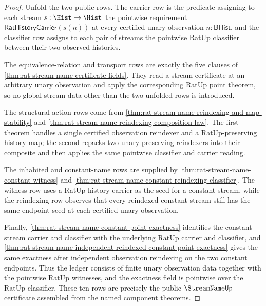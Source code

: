 \begin{proof}
Unfold the two public rows. The carrier row is the predicate assigning to each
stream $s:\Hist\to\Hist$ the pointwise requirement
$\mathsf{RatHistoryCarrier}(s(n))$ at every certified unary observation
$n:\mathsf{BHist}$, and the classifier row assigns to each pair of streams the
pointwise RatUp classifier between their two observed histories.

The equivalence-relation and transport rows are exactly the five clauses of
\autoref{thm:rat-stream-name-certificate-fields}. They read a stream
certificate at an arbitrary unary observation and apply the corresponding
RatUp point theorem, so no global stream data other than the two unfolded rows
is introduced.

The structural action rows come from
\autoref{thm:rat-stream-name-reindexing-and-map-stability} and
\autoref{thm:rat-stream-name-reindexing-composition-law}. The first theorem
handles a single certified observation reindexer and a RatUp-preserving history
map; the second repacks two unary-preserving reindexers into their composite and
then applies the same pointwise classifier and carrier reading.

The inhabited and constant-name rows are supplied by
\autoref{thm:rat-stream-name-constant-witness} and
\autoref{thm:rat-stream-name-constant-reindexing-classifier}. The witness row
uses a RatUp history carrier as the seed for a constant stream, while the
reindexing row observes that every reindexed constant stream still has the same
endpoint seed at each certified unary observation.

Finally,
\autoref{thm:rat-stream-name-constant-point-exactness} identifies the constant
stream carrier and classifier with the underlying RatUp carrier and classifier,
and
\autoref{thm:rat-stream-name-independent-reindexed-constant-point-exactness}
gives the same exactness after independent observation reindexing on the two
constant endpoints. Thus the ledger consists of finite unary observation data
together with the pointwise RatUp witnesses, and the exactness field is
pointwise over the RatUp classifier. These ten rows are precisely the public
$\StreamNameUp$ certificate assembled from the named component theorems.
\end{proof}
